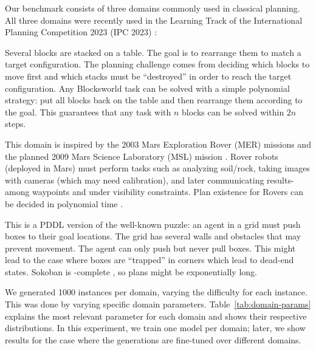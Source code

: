 Our benchmark consists of three domains commonly used in classical planning. All
three domains were recently used in the Learning Track of the International
Planning Competition 2023 (IPC 2023) \citep{taitler-et-al-aimag2024}:

\begin{description}[font=\normalfont\itshape]
\item[Blocksworld:]

Several blocks are stacked on a table. The goal is to rearrange them to match a
target configuration. The planning challenge comes from deciding which blocks to
move first and which stacks must be ``destroyed'' in order to reach the target
configuration. Any Blocksworld task can be solved with a simple polynomial
strategy: put all blocks back on the table and then rearrange them according to
the goal. This guarantees that any task with $n$ blocks can be solved within
$2n$ steps.

\item[Rovers:]

This domain is inspired by the 2003 Mars Exploration Rover (MER) missions and
the planned 2009 Mars Science Laboratory (MSL) mission
\cite{long-fox-jair2003}. Rover robots (deployed in Mars) must perform tasks
such as analyzing soil/rock, taking images with cameras (which may need
calibration), and later communicating results-among waypoints and under
visibility constraints. Plan existence for Rovers can be decided in polynomial time \cite{helmert-icaps2006}.

\item[Sokoban:]

This is a PDDL version of the well-known puzzle: an agent in a grid must push
boxes to their goal locations. The grid has several walls and obstacles that may
prevent movement. The agent can only push but never pull boxes. This might lead
to the case where boxes are ``trapped'' in corners which lead to dead-end
states. Sokoban is \pspace-complete \citep{culberson-tr1997}, so plans might be
exponentially long.
\end{description}



We generated 1000 instances per domain,  varying the difficulty for each instance. This was done by varying specific domain parameters.
Table~\ref{tab:domain-params} explains the
most relevant parameter for each domain and shows their respective
distributions. In this experiment, we train one model per domain; later, we show
results for the case where the generations are fine-tuned over different
domains.

